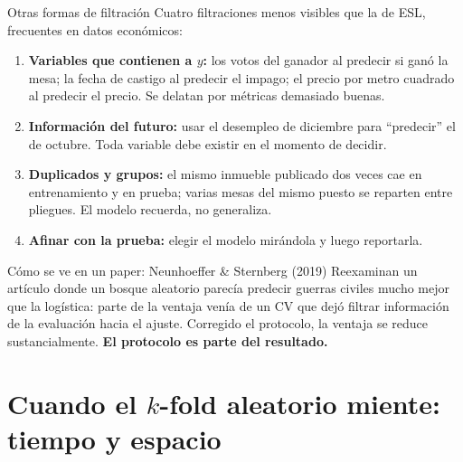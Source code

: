 \documentclass{beamer}
\newcommand{\1}{\mathbb{I}}
\begin{document}
\begin{frame}{Otras formas de filtración}
\small
Cuatro filtraciones menos visibles que la de ESL, frecuentes en datos económicos:
\begin{enumerate}\itemsep3pt
  \item \textbf{Variables que contienen a $y$:} los votos del ganador al predecir si ganó la mesa; la fecha de castigo al predecir el impago; el precio por metro cuadrado al predecir el precio. Se delatan por métricas demasiado buenas. \pause
  \item \textbf{Información del futuro:} usar el desempleo de diciembre para ``predecir'' el de octubre. Toda variable debe existir en el momento de decidir. \pause
  \item \textbf{Duplicados y grupos:} el mismo inmueble publicado dos veces cae en entrenamiento y en prueba; varias mesas del mismo puesto se reparten entre pliegues. El modelo recuerda, no generaliza. \pause
  \item \textbf{Afinar con la prueba:} elegir el modelo mirándola y luego reportarla.
\end{enumerate}
\pause
\begin{block}{Cómo se ve en un paper: Neunhoeffer \& Sternberg (2019)}
Reexaminan un artículo donde un bosque aleatorio parecía predecir guerras civiles mucho mejor que la logística: parte de la ventaja venía de un CV que dejó filtrar información de la evaluación hacia el ajuste. Corregido el protocolo, la ventaja se reduce sustancialmente. \textbf{El protocolo es parte del resultado.}
\end{block}
\end{frame}


\section{Cuando el $k$-fold aleatorio miente: tiempo y espacio}
\begin{frame}[noframenumbering]
\tableofcontents[currentsection]
\end{frame}
\end{document}
